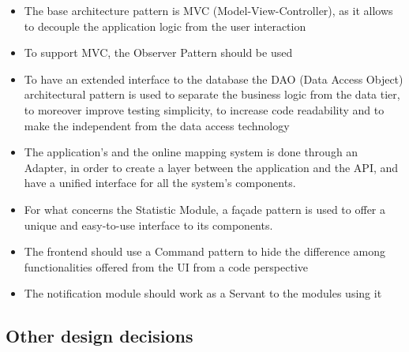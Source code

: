 \begin{itemize}[itemsep=-1mm, topsep=-1mm]
	\item The base architecture pattern is MVC (Model-View-Controller), as it allows to decouple the application logic from the user interaction
	\item To support MVC, the Observer Pattern\textsuperscript{\cite{observer}} should be used
	\item To have an extended interface to the database the DAO\textsuperscript{\cite{dao3}} (Data Access Object) architectural pattern is used to separate the business logic from the data tier, to moreover improve testing simplicity, to increase code readability and to make the independent from the data access technology   
	\item The application's and the online mapping system is done through an Adapter, in order to create a layer between the application and the API, and have a unified interface\textsuperscript{\cite{adapter}} for all the system's components.
	\item For what concerns the Statistic Module, a façade pattern\textsuperscript{\cite{facade}} is used to offer a unique and easy-to-use interface to its components.
	\item The frontend should use a Command pattern\textsuperscript{\cite{command}} to hide the difference among functionalities offered from the UI from a code perspective
	\item The notification module should work as a Servant to the modules using it
\end{itemize}\vspace{.5\baselineskip} 

\subsection{Other design decisions}


